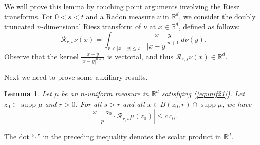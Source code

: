 \documentclass[11pt]{amsart}
\newcommand{\R}{{\mathbb R}}       %
\newcommand{\RR}{{\mathcal R}}
\newcommand{\rf}[1]{{(\ref{#1})}}
\newcommand{\supp}{\operatorname{supp}}
\newcommand{\vv}{{\vspace{2mm}}}
\newtheorem{lemma}[theorem]{Lemma}
\theoremstyle{definition}
\theoremstyle{remark}
\numberwithin{equation}{section}
\begin{document}
\vv
We will prove this lemma by touching point arguments involving the
Riesz transforms. For $0<s< t$ and a Radon measure $\nu$ in $\R^d$, we consider 
the doubly truncated $n$-dimensional Riesz transform of $\nu$ at $x\in\R^d$, defined as follows:
$$\RR_{r,s}\nu(x) = \int_{r<|x-y|\leq s} \frac{x-y}{|x-y|^{n+1}}\,d\nu(y).$$
Observe that the kernel $ \frac{x-y}{|x-y|^{n+1}}$ is vectorial, and thus $\RR_{r,s}\nu(x)\in \R^d$.

Next we need to prove some auxiliary results.
\vv


\begin{lemma}\label{lemriesz}
Let $\mu$ be an $n$-uniform measure in $\R^d$ satisfying \rf{equnif21}. Let $z_0\in\supp\mu$ and $r>0$. For all $s>r$ and
all $x\in B(z_0,r)\cap\supp\mu$, we have
$$\left|\frac{x-z_0}r\cdot\RR_{r,s}\mu(z_0)\right|\leq c\,c_0.$$
\end{lemma}

The dot ``$\cdot$'' in the preceding inequality denotes the scalar product in $\R^d$.
\end{document}
